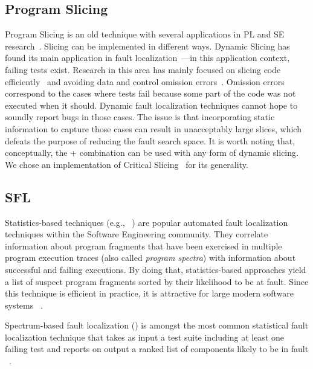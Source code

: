 \documentclass{article}
\begin{document}

\subsection{Program Slicing}

Program Slicing is an old technique with several applications in PL
and SE research~\cite{Weiser:1981:PS:800078.802557}. Slicing can be
implemented in different ways. Dynamic Slicing has found its main
application in fault
localization~\cite{Agrawal:1990:DPS:93542.93576}---in this application
context, failing tests exist. Research in this area has mainly focused
on slicing code
efficiently~\cite{Wang:2008:DSJ:1330017.1330021,Wang:2004:UCB:998675.999455}
and avoiding data and control omission
errors~\cite{Zhang:2007:TLE:1250734.1250782,Lin:2018:BDE:3238147.3238163}. Omission errors correspond to the
cases where tests fail because some part of the code was not executed
when it should. Dynamic fault localization techniques cannot hope to
soundly report bugs in those cases. The issue is that incorporating
static information to capture those cases can result in unacceptably
large slices, which defeats the purpose of reducing the fault search
space. It is worth noting that, conceptually, the \sfl{}+\ds{} combination
can be used with any form of dynamic slicing. We chose an
implementation of Critical
Slicing~\cite{DeMillo:1996:CSS:229000.226310} for its generality.


\subsection{SFL}

Statistics-based techniques (e.g., ~\cite{Pearson:2017:EIF:3097368.3097441}) are
popular automated fault localization techniques within the Software Engineering
community. They correlate information about program fragments that have been
exercised in multiple program execution traces (also called \textit{program
spectra}) with information about successful and failing executions. By doing
that, statistics-based approaches yield a list of suspect program fragments
sorted by their likelihood to be at fault. Since this technique is efficient in
practice, it is attractive for large modern software systems ~\cite{Zoeteweij:2007:DES:1251988.1253298}.

Spectrum-based fault localization (\sfl{}) is amongst the most common statistical
fault localization technique that takes as input a test suite including at least
one failing test and reports on output a ranked list of components likely to be
in fault ~\cite{FLSurvey2016,DBLP:conf/kbse/JonesH05,DBLP:journals/smr/LuciaLJTB14,DBLP:journals/jss/AbreuZGG09}.
\end{document}
